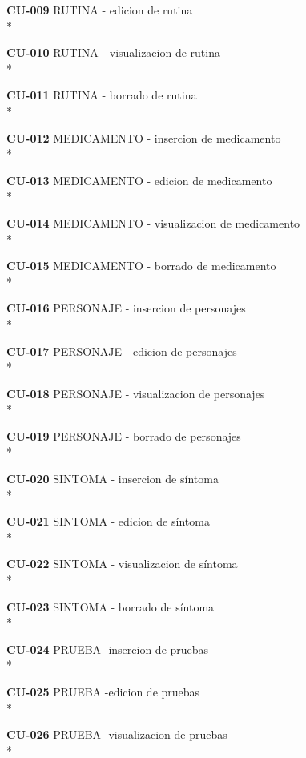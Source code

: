 \documentclass[../pfc.tex]{subfiles}
\begin{document}
	\textbf{CU-009}	RUTINA - edicion de rutina\\*
	
	\textbf{CU-010}	RUTINA - visualizacion de rutina\\*
	
	\textbf{CU-011}	RUTINA - borrado de rutina\\*
	
	
	
	\textbf{CU-012}	MEDICAMENTO - insercion de medicamento\\*
	
	\textbf{CU-013}	 MEDICAMENTO - edicion de medicamento\\*
	
	\textbf{CU-014}	 MEDICAMENTO - visualizacion de medicamento\\*
	
	\textbf{CU-015}	 MEDICAMENTO - borrado de medicamento\\*
	
	
	
	\textbf{CU-016}	 PERSONAJE - insercion de personajes\\*
	
	\textbf{CU-017}	 PERSONAJE - edicion de personajes\\*
	
	\textbf{CU-018}	 PERSONAJE - visualizacion de personajes\\*
	
	\textbf{CU-019}	 PERSONAJE - borrado de personajes\\*
	
	
	
	\textbf{CU-020}	 SINTOMA - insercion de síntoma\\*
	
	\textbf{CU-021}	 SINTOMA - edicion de síntoma\\*
	
	\textbf{CU-022}	 SINTOMA - visualizacion de síntoma\\*
	
	\textbf{CU-023}	 SINTOMA - borrado de síntoma\\*
	
	
	
	\textbf{CU-024}	 PRUEBA -insercion de pruebas\\*
	
	\textbf{CU-025}	 PRUEBA -edicion de pruebas\\*
	
	\textbf{CU-026}	 PRUEBA -visualizacion de pruebas\\*
	
\end{document}
